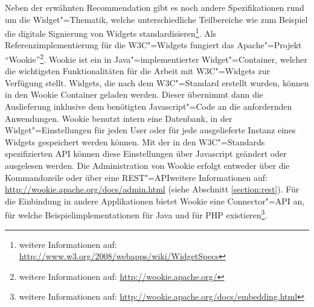Neben der erwähnten Recommendation gibt es noch andere Spezifikationen rund um die Widget"=Thematik, welche unterschiedliche Teilbereiche wie zum Beispiel die digitale Signierung von Widgets standardisieren\footnote{weitere Informationen auf: \url{http://www.w3.org/2008/webapps/wiki/WidgetSpecs}}. Als Referenzimplementierung für die W3C"=Widgets fungiert das Apache"=Projekt "`Wookie"'\footnote{weitere Informationen auf: \url{http://wookie.apache.org/}}. Wookie ist ein in Java"=implementierter Widget"=Container, welcher die wichtigsten Funktionalitäten für die Arbeit mit \ac{W3C}"=Widgets zur Verfügung stellt. Widgets, die nach dem \ac{W3C}"=Standard erstellt wurden, können in den Wookie Container geladen werden. Dieser übernimmt dann die Auslieferung inklusive dem benötigten Javascript"=Code an die anfordernden Anwendungen. Wookie benutzt intern eine Datenbank, in der Widget"=Einstellungen für jeden User oder für jede ausgelieferte Instanz eines Widgets gespeichert werden können. Mit der in den \ac{W3C}"=Standards spezifizierten \ac{API} können diese Einstellungen über Javascript geändert oder ausgelesen werden. Die Administration von Wookie erfolgt entweder über die Kommandozeile oder über eine REST"=\ac{API}{weitere Informationen auf: \url{http://wookie.apache.org/docs/admin.html}} (siehe Abschnitt \ref{section:rest}). Für die Einbindung in andere Applikationen bietet Wookie eine Connector"=\ac{API} an, für welche Beispielimplementationen für Java und für PHP existieren\footnote{weitere Informationen auf: \url{http://wookie.apache.org/docs/embedding.html}}.

